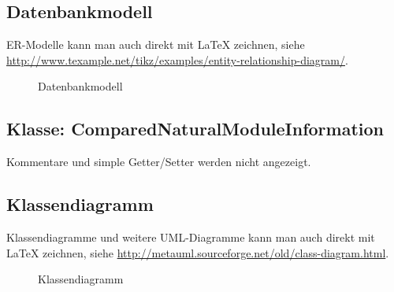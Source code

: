 

\subsection{Datenbankmodell}
\label{app:Datenbankmodell}
ER-Modelle kann man auch direkt mit \LaTeX{} zeichnen, siehe \zB \url{http://www.texample.net/tikz/examples/entity-relationship-diagram/}.
\begin{figure}[htb]
\centering
{}
\caption{Datenbankmodell}
\end{figure}
\clearpage


\clearpage


\clearpage


\subsection{Klasse: ComparedNaturalModuleInformation}
\label{app:CNMI}
Kommentare und simple Getter/Setter werden nicht angezeigt.

\clearpage

\subsection{Klassendiagramm}
\label{app:Klassendiagramm}
Klassendiagramme und weitere \acs{UML}-Diagramme kann man auch direkt mit \LaTeX{} zeichnen, siehe \zB \url{http://metauml.sourceforge.net/old/class-diagram.html}.
\begin{figure}[htb]
\centering
{}
\caption{Klassendiagramm}
\end{figure}
\clearpage


